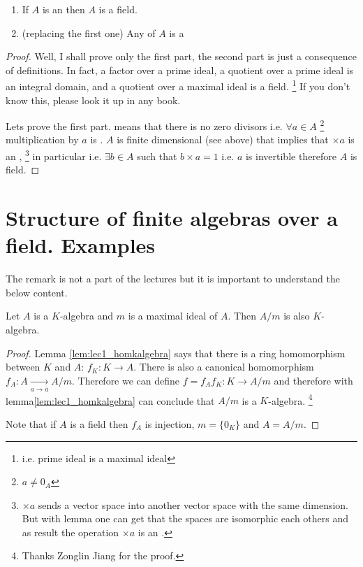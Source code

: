 \begin{proposition}
  \begin{enumerate}
    \item If $A$ is an  then $A$ is a
      field.
    \item (replacing the first one) Any
       of $A$ is a 
  \end{enumerate}
  \begin{proof}
     Well, I shall prove only the first part, the second part is just
     a consequence of definitions. In fact, a factor over a prime
     ideal, a quotient over a prime ideal is an integral domain, and a
     quotient over a maximal ideal is a field.
     \footnote{
       i.e. prime ideal is a maximal ideal 
     }
     If you don't know this,
     please look it up in any book.

     Lets prove the first part.  means
     that there is no zero divisors i.e. $\forall a \in A$
     \footnote{
       $a \ne 0_A$
     }
     multiplication by $a$ is . $A$ is finite
     dimensional  (see above) that implies
     that $\times a$ is an 
     ,
     \footnote{
       $\times a$ sends a vector space  into another vector space with
       the same dimension. But with lemma  one
       can get that the spaces are isomorphic each others and as
       result the operation $\times a$ is an .
     }
     in particular  i.e. $\exists b \in A$
     such that $b \times a = 1$ i.e. $a$ is invertible therefore
     $A$ is field.     
  \end{proof}
  \label{prop:lec4_ideals}
\end{proposition}

\section{Structure of finite algebras over a field. Examples}

\begin{remark}
  The remark is not a part of the lectures but it is important to
  understand the below content.

  Let $A$ is a $K$-algebra and $m$ is a maximal ideal of $A$. Then
  $A/m$ is also $K$-algebra.

  \begin{proof}
    Lemma \ref{lem:lec1_homkalgebra} says that there is a ring homomorphism
    between $K$ and $A$: $f_K: K \to A$. There is also a canonical
    homomorphism $f_A: A \xrightarrow[a \to \bar{a}]{} A/m$. Therefore
    we can define $f = f_A f_K: K \to A/m$ and therefore with
    lemma\ref{lem:lec1_homkalgebra} can conclude that $A/m$ is a
    $K$-algebra.
    \footnote{
      Thanks Zonglin Jiang for the proof.
    }

    Note that if $A$ is a field then $f_A$ is injection, $m=\{0_K\}$
    and $A = A/m$. 
  \end{proof}
  \label{rem:lec5_quotientkalgebra}
\end{remark}

